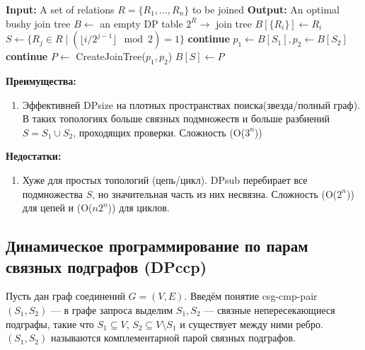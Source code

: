 \begin{algorithm}[H]
    \begin{algorithmic}[1]
        \State \textbf{Input:} A set of relations $R = \{R_1, \dots, R_n\}$ to be joined
        \State \textbf{Output:} An optimal bushy join tree
        \State $B \gets$ an empty DP table $2^R \to$ join tree
            \State $B[\{R_i\}] \gets R_i$
        \EndFor
            \State $S \gets \{ R_j \in R \mid ( \lfloor i / 2^{j-1} \rfloor \mod 2) = 1 \}$
                    \State \textbf{continue}
                \EndIf
                \State $p_1 \gets B[S_1], p_2 \gets B[S_2]$
                 \textbf{continue} \EndIf
                \State $P \gets$ CreateJoinTree($p_1, p_2$)
                    \State $B[S] \gets P$
                \EndIf
            \EndFor
        \EndFor
    \end{algorithmic}
\end{algorithm}

\textbf{Преимущества:}
\begin{enumerate}
    \item Эффективней DPsize на плотных пространствах поиска(звезда/полный граф). В таких топологиях больше связных подмножеств и больше разбиений $S = S_1 \cup S_2$,
    проходящих проверки. Сложность (O($3^{n}$))
\end{enumerate}

\textbf{Недостатки:}
\begin{enumerate}
    \item Хуже для простых топологий (цепь/цикл). DPsub перебирает все подмножества $S$, но значительная часть из них несвязна. Сложность (O($2^{n}$)) для цепей 
    и (O($n2^{n}$)) для циклов.
\end{enumerate}


\subsection{Динамическое программирование по парам связных подграфов (DPccp)}


Пусть дан граф соединений $G = (V, E)$. Введём понятие csg-cmp-pair $(S_1, S_2)$ ---
в графе запроса выделим $S_1, S_2$ --- связные непересекающиеся подграфы, такие что $S_1 \subseteq V$,
$S_2 \subseteq V \setminus S_1$ и существует между ними ребро.
$(S_1, S_2)$ называются комплементарной парой связных подграфов.
\par


